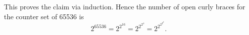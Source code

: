\begin{questions}
\begin{partquestions}{\roman*}
        This proves the claim via induction. Hence the number of open curly braces for the counter set of 65536 is
        \[
            2^{65536} = 2^{2^{16}} = 2^{2^{2^4}} = 2^{2^{2^{2^2}}}.
        \]
    \end{partquestions}
\end{questions}